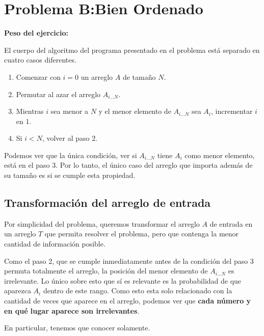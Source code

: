 \newpage{}
\section{Problema B:\@ Bien Ordenado}
\textbf{Peso del ejercicio: }

\newcommand{\aiN}{\(A_{i\dots{}N}\)}
\newcommand{\pop}{\operatorname{pop}}
\newcommand{\nicesum}[1]{\sum\nolimits^{\left|#1\right|}_{i = 1}{#1_i}}

\newcommand{\smol}[1]{\tag*{\parbox{8em}{\textcolor{darkgray}{\small{#1}}}}}

El cuerpo del algoritmo del programa presentado en el problema está separado en cuatro casos diferentes.

\begin{enumerate}
	\item Comenzar con \(i = 0\) un arreglo \(A\) de tamaño \(N\).
	\item Permutar al azar el arreglo \aiN{}.
	\item Mientras \(i\) sea menor a \(N\) y el menor elemento de \aiN{} sea \(A_i\), incrementar \(i\) en 1.
	\item Si \(i < N\), volver al paso 2.
\end{enumerate}

Podemos ver que la única condición, ver si \aiN{} tiene \(A_i\) como menor elemento, está en el paso 3. Por lo tanto, el único caso del arreglo que importa además de su tamaño es si se cumple esta propiedad.

\subsection{Transformación del arreglo de entrada}

Por simplicidad del problema, queremos transformar el arreglo \(A\) de entrada en un arreglo \(T\) que permita resolver el problema, pero que contenga la menor cantidad de información posible.

Como el paso 2, que se cumple inmediatamente antes de la condición del paso 3 permuta totalmente el arreglo, la posición del menor elemento de \aiN{} es irrelevante. Lo único sobre esto que sí es relevante es la probabilidad de que aparezca \(A_i\) dentro de este rango. Como esto esta solo relacionado con la cantidad de veces que aparece en el arreglo, podemos ver que \textbf{cada número y en qué lugar aparece son irrelevantes}.

En particular, tenemos que conocer solamente.

